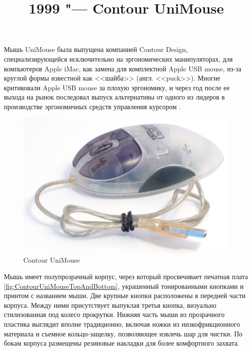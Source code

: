 \documentclass[11pt, a4paper]{article}
\begin{document}
\title{1999 "--- Contour UniMouse}
\date{}
\maketitle
{}
Мышь UniMouse была выпущена компанией Contour Design, специализирующейся исключительно на эргономических манипуляторах, для компьютеров Apple iMac, как замена для комплектной Apple USB mouse, из-за круглой формы известной как <<шайба>> (англ. <<puck>>). Многие критиковали Apple USB mouse за плохую эргономику, и через год после ее выхода на рынок последовал выпуск альтернативы от одного из лидеров в производстве эргономичных средств управления курсором \cite{pressrelease}.

\begin{figure}[h]
    \centering
    \includegraphics[scale=0.5]{1999_contour_unimouse/pic_30.jpg}
    \caption{Contour UniMouse}
    \label{fig:ContourUniMousePic}
\end{figure}

Мышь имеет полупрозрачный корпус, через который просвечивает печатная плата \ref{fig:ContourUniMouseTopAndBottom}, украшенный тонированными кнопками и принтом с названием мыши. Две крупные кнопки расположены в передней части корпуса. Между ними присутствует выпуклая третья кнопка, визуально стилизованная под колесо прокрутки. Нижняя часть мыши из прозрачного пластика выглядит вполне традиционно, включая ножки из низкофрикционного материала и съемное кольцо-защелку, позволяющее извлечь шар для чистки. По бокам корпуса размещены резиновые накладки для более комфортного захвата.
\end{document}
